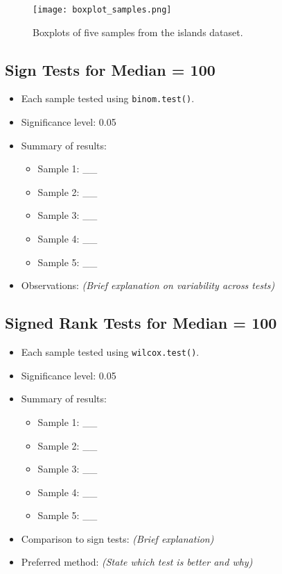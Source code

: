 \documentclass{article}
\begin{document}
\begin{figure}[H]
    \centering
    \texttt{[image: boxplot\_samples.png]} %
    \caption{Boxplots of five samples from the islands dataset.}
    \label{fig:islands_boxplot}
\end{figure}

\subsection{Sign Tests for Median = 100}
\begin{itemize}
    \item Each sample tested using \texttt{binom.test()}.
    \item Significance level: 0.05
    \item Summary of results:
    \begin{itemize}
        \item Sample 1: \_\_
        \item Sample 2: \_\_
        \item Sample 3: \_\_
        \item Sample 4: \_\_
        \item Sample 5: \_\_
    \end{itemize}
    \item Observations: \textit{(Brief explanation on variability across tests)}
\end{itemize}

\subsection{Signed Rank Tests for Median = 100}
\begin{itemize}
    \item Each sample tested using \texttt{wilcox.test()}.
    \item Significance level: 0.05
    \item Summary of results:
    \begin{itemize}
        \item Sample 1: \_\_
        \item Sample 2: \_\_
        \item Sample 3: \_\_
        \item Sample 4: \_\_
        \item Sample 5: \_\_
    \end{itemize}
    \item Comparison to sign tests: \textit{(Brief explanation)}
    \item Preferred method: \textit{(State which test is better and why)}
\end{itemize}
\end{document}
